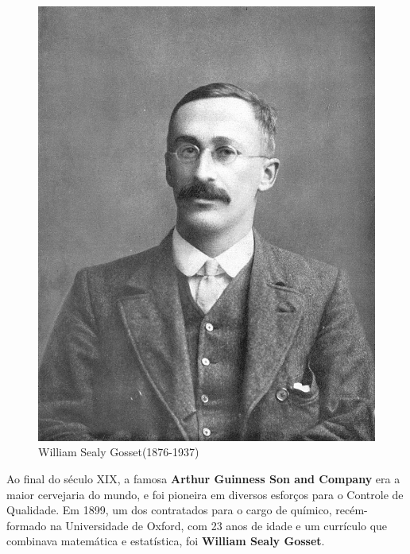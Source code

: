 \begin{figure}
    \centering
\includegraphics[scale=0.15]{figures/William_Sealy_Gosset.jpeg}
    \caption{William Sealy Gosset(1876-1937)}
    \label{fig:my_label3}
\end{figure}


Ao final do século XIX, a famosa \textbf{Arthur Guinness Son and Company} era a maior cervejaria do mundo, e foi pioneira em diversos esforços para o Controle de Qualidade. Em 1899, um dos contratados para o cargo de químico, recém-formado na Universidade de Oxford, com 23 anos de idade e um currículo que combinava matemática e estatística, foi \textbf{William Sealy Gosset}.\vskip0.3cm



